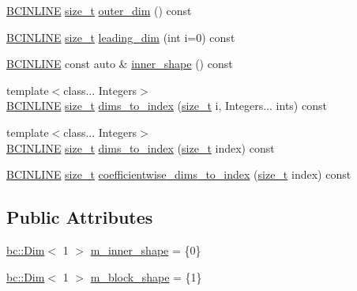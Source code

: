 \begin{DoxyCompactItemize}
\item 
\hyperlink{common_8h_a6699e8b0449da5c0fafb878e59c1d4b1}{B\+C\+I\+N\+L\+I\+NE} \hyperlink{namespacebc_aaf8e3fbf99b04b1b57c4f80c6f55d3c5}{size\+\_\+t} \hyperlink{structbc_1_1Strided__Vector__Shape_a19a29dadd17c10878238f95586e33395}{outer\+\_\+dim} () const
\item 
\hyperlink{common_8h_a6699e8b0449da5c0fafb878e59c1d4b1}{B\+C\+I\+N\+L\+I\+NE} \hyperlink{namespacebc_aaf8e3fbf99b04b1b57c4f80c6f55d3c5}{size\+\_\+t} \hyperlink{structbc_1_1Strided__Vector__Shape_a382394b699656e51133998678cede6be}{leading\+\_\+dim} (int i=0) const
\item 
\hyperlink{common_8h_a6699e8b0449da5c0fafb878e59c1d4b1}{B\+C\+I\+N\+L\+I\+NE} const auto \& \hyperlink{structbc_1_1Strided__Vector__Shape_a59feef70aa8612e3b8db3af5f3f44f95}{inner\+\_\+shape} () const
\item 
{\footnotesize template$<$class... Integers$>$ }\\\hyperlink{common_8h_a6699e8b0449da5c0fafb878e59c1d4b1}{B\+C\+I\+N\+L\+I\+NE} \hyperlink{namespacebc_aaf8e3fbf99b04b1b57c4f80c6f55d3c5}{size\+\_\+t} \hyperlink{structbc_1_1Strided__Vector__Shape_ab9c66e9a077e7d3d4e9d49b6f526c504}{dims\+\_\+to\+\_\+index} (\hyperlink{namespacebc_aaf8e3fbf99b04b1b57c4f80c6f55d3c5}{size\+\_\+t} i, Integers... ints) const
\item 
{\footnotesize template$<$class... Integers$>$ }\\\hyperlink{common_8h_a6699e8b0449da5c0fafb878e59c1d4b1}{B\+C\+I\+N\+L\+I\+NE} \hyperlink{namespacebc_aaf8e3fbf99b04b1b57c4f80c6f55d3c5}{size\+\_\+t} \hyperlink{structbc_1_1Strided__Vector__Shape_a010b70ecc00d3138c8830a8919433eee}{dims\+\_\+to\+\_\+index} (\hyperlink{namespacebc_aaf8e3fbf99b04b1b57c4f80c6f55d3c5}{size\+\_\+t} index) const
\item 
\hyperlink{common_8h_a6699e8b0449da5c0fafb878e59c1d4b1}{B\+C\+I\+N\+L\+I\+NE} \hyperlink{namespacebc_aaf8e3fbf99b04b1b57c4f80c6f55d3c5}{size\+\_\+t} \hyperlink{structbc_1_1Strided__Vector__Shape_ac4fa697e990136ae9e5a69f8c67db19d}{coefficientwise\+\_\+dims\+\_\+to\+\_\+index} (\hyperlink{namespacebc_aaf8e3fbf99b04b1b57c4f80c6f55d3c5}{size\+\_\+t} index) const
\end{DoxyCompactItemize}
\subsection*{Public Attributes}
\begin{DoxyCompactItemize}
\item 
\hyperlink{structbc_1_1Dim}{bc\+::\+Dim}$<$ 1 $>$ \hyperlink{structbc_1_1Strided__Vector__Shape_a75ff9b027630f4530cba376a5ca66c12}{m\+\_\+inner\+\_\+shape} = \{0\}
\item 
\hyperlink{structbc_1_1Dim}{bc\+::\+Dim}$<$ 1 $>$ \hyperlink{structbc_1_1Strided__Vector__Shape_af291680e29bd15fd5541d0d07c50e250}{m\+\_\+block\+\_\+shape} = \{1\}
\end{DoxyCompactItemize}
